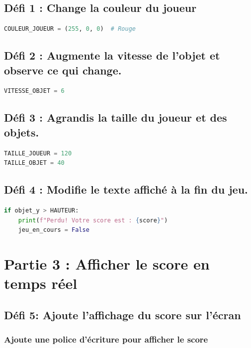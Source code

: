 \subsection*{Défi 1 : Change la couleur du joueur}
\begin{lstlisting}[style=pythonstyle, language=python]
COULEUR_JOUEUR = (255, 0, 0)  # Rouge
\end{lstlisting}

\subsection*{Défi 2 : Augmente la vitesse de l’objet et observe ce qui change.}
\begin{lstlisting}[style=pythonstyle, language=python]
VITESSE_OBJET = 6
\end{lstlisting}

\subsection*{Défi 3 : Agrandis la taille du joueur et des objets.}
\begin{lstlisting}[style=pythonstyle, language=python]
TAILLE_JOUEUR = 120
TAILLE_OBJET = 40
\end{lstlisting}


\subsection*{Défi 4 : Modifie le texte affiché à la fin du jeu.}
\begin{lstlisting}[style=pythonstyle, language=python]
if objet_y > HAUTEUR:
    print(f"Perdu! Votre score est : {score}")
    jeu_en_cours = False
\end{lstlisting}
\vspace{1cm}
\section*{Partie 3 : Afficher le score en temps réel}

\subsection*{Défi 5: Ajoute l'affichage du score sur l'écran}

\subsubsection*{Ajoute une police d'écriture pour afficher le score}

